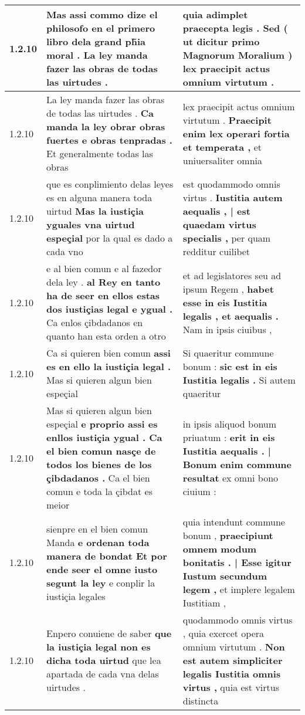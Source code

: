 \begin{tabular}{|p{1cm}|p{6.5cm}|p{6.5cm}|}
1.2.10 & Mas assi commo dize el philosofo \textbf{ en el primero libro dela grand ph̃ia moral . } La ley manda fazer las obras de todas las uirtudes . & quia adimplet praecepta legis . \textbf{ Sed ( ut dicitur primo Magnorum Moralium ) } lex praecipit actus omnium virtutum . \\\hline
1.2.10 & La ley manda fazer las obras de todas las uirtudes . \textbf{ Ca manda la ley obrar obras fuertes e obras tenpradas . } Et generalmente todas las obras & lex praecipit actus omnium virtutum . \textbf{ Praecipit enim lex operari fortia et temperata , } et uniuersaliter omnia \\\hline
1.2.10 & que es conplimiento delas leyes es en alguna manera toda uirtud \textbf{ Mas la iustiçia yguales vna uirtud espeçial } por la qual es dado a cada vno & est quodammodo omnis virtus . \textbf{ Iustitia autem aequalis , | est quaedam virtus specialis , } per quam redditur cuilibet \\\hline
1.2.10 & e al bien comun e al fazedor dela ley . \textbf{ al Rey en tanto ha de seer en ellos estas dos iustiçias legal e ygual . } Ca enlos çibdadanos en quanto han esta orden a otro & et ad legislatores seu ad ipsum Regem , \textbf{ habet esse in eis Iustitia legalis , et aequalis . } Nam in ipsis ciuibus , \\\hline
1.2.10 & Ca si quieren bien comun \textbf{ assi es en ello la iustiçia legal . } Mas si quieren algun bien espeçial & Si quaeritur commune bonum : \textbf{ sic est in eis Iustitia legalis . } Si autem quaeritur \\\hline
1.2.10 & Mas si quieren algun bien espeçial \textbf{ e proprio assi es enllos iustiçia ygual . Ca el bien comun nasçe de todos los bienes de los çibdadanos . } Ca el bien comun e toda la çibdat es meior & in ipsis aliquod bonum priuatum : \textbf{ erit in eis Iustitia aequalis . | Bonum enim commune resultat } ex omni bono ciuium : \\\hline
1.2.10 & sienpre en el bien comun Manda \textbf{ e ordenan toda manera de bondat Et por ende seer el omne iusto segunt la ley } e conplir la iustiçia legales & quia intendunt commune bonum , \textbf{ praecipiunt omnem modum bonitatis . | Esse igitur Iustum secundum legem , } et implere legalem Iustitiam , \\\hline
1.2.10 & Enpero conuiene de saber \textbf{ que la iustiçia legal non es dicha toda uirtud } que lea apartada de cada vna delas uirtudes . & quodammodo omnis virtus , quia exercet opera omnium virtutum . \textbf{ Non est autem simpliciter legalis Iustitia omnis virtus , } quia est virtus distincta \\\hline

\end{tabular}
